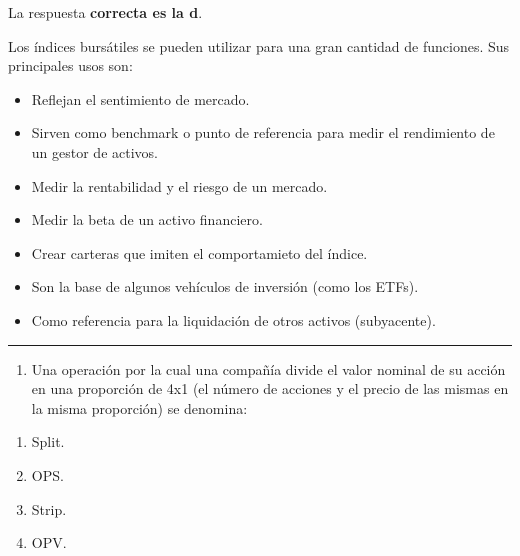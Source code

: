 \documentclass[
  letterpaper,
  DIV=11,
  numbers=noendperiod]{scrreprt}
\providecommand{\tightlist}{%
  \setlength{\itemsep}{0pt}\setlength{\parskip}{0pt}}\usepackage{longtable,booktabs,array}
\begin{document}
\begin{tcolorbox}[enhanced jigsaw, left=2mm, opacityback=0, colback=white, breakable, arc=.35mm, bottomrule=.15mm, rightrule=.15mm, toprule=.15mm, leftrule=.75mm, colframe=quarto-callout-tip-color-frame]
\begin{minipage}[t]{5.5mm}
\textcolor{quarto-callout-tip-color}{\faLightbulb}
\end{minipage}%
\begin{minipage}[t]{\textwidth - 5.5mm}

La respuesta \textbf{correcta es la d}.

Los índices bursátiles se pueden utilizar para una gran cantidad de
funciones. Sus principales usos son:

\begin{itemize}
\item
  Reflejan el sentimiento de mercado.
\item
  Sirven como benchmark o punto de referencia para medir el rendimiento
  de un gestor de activos.
\item
  Medir la rentabilidad y el riesgo de un mercado.
\item
  Medir la beta de un activo financiero.
\item
  Crear carteras que imiten el comportamieto del índice.
\item
  Son la base de algunos vehículos de inversión (como los ETFs).
\item
  Como referencia para la liquidación de otros activos (subyacente).
\end{itemize}

\end{minipage}%
\end{tcolorbox}

\begin{center}\rule{0.5\linewidth}{0.5pt}\end{center}

\begin{enumerate}
\def\labelenumi{\arabic{enumi}.}
\setcounter{enumi}{27}
\tightlist
\item
  Una operación por la cual una compañía divide el valor nominal de su
  acción en una proporción de 4x1 (el número de acciones y el precio de
  las mismas en la misma proporción) se denomina:
\end{enumerate}

\begin{enumerate}
\def\labelenumi{\alph{enumi})}
\item
  Split.
\item
  OPS.
\item
  Strip.
\item
  OPV.
\end{enumerate}
\end{document}
